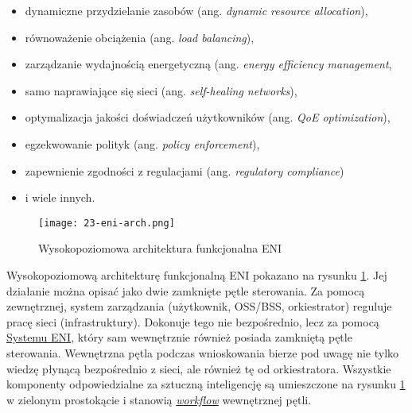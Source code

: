 \begin{itemize}
    \item dynamiczne przydzielanie zasobów (ang. \textit{dynamic resource allocation}), 
    \item równoważenie obciążenia (ang. \textit{load balancing}), 
    \item zarządzanie wydajnością energetyczną (ang. \textit{energy efficiency management}, 
    \item samo naprawiające się sieci (ang. \textit{self-healing networks}), 
    \item optymalizacja jakości doświadczeń użytkowników (ang. \textit{QoE optimization}), 
    \item egzekwowanie polityk (ang. \textit{policy enforcement}), 
    \item zapewnienie zgodności z regulacjami (ang. \textit{regulatory compliance}) 
    \item i wiele innych.
\end{itemize}

\begin{figure}[!htbp]
    \centering \texttt{[image: 23-eni-arch.png]}
    \caption{Wysokopoziomowa architektura funkcjonalna ENI}\label{fig:23-eni-arch}
\end{figure}

Wysokopoziomową architekturę funkcjonalną ENI pokazano na rysunku \ref{fig:23-eni-arch}. Jej działanie można opisać jako dwie zamknięte pętle sterowania. Za pomocą zewnętrznej, system zarządzania (użytkownik, OSS/BSS, orkiestrator) reguluje pracę sieci (infrastruktury). Dokonuje tego nie bezpośrednio, lecz za pomocą \hyperlink{def:system-eni}{Systemu ENI}, który sam wewnętrznie również posiada zamkniętą pętle sterowania. Wewnętrzna pętla podczas wnioskowania bierze pod uwagę nie tylko wiedzę płynącą bezpośrednio z sieci, ale również tę od orkiestratora. Wszystkie komponenty odpowiedzialne za sztuczną inteligencję są umieszczone na rysunku \ref{fig:23-eni-arch} w zielonym prostokącie i stanowią \hyperlink{def:workflow}{\textit{workflow}} wewnętrznej pętli. 